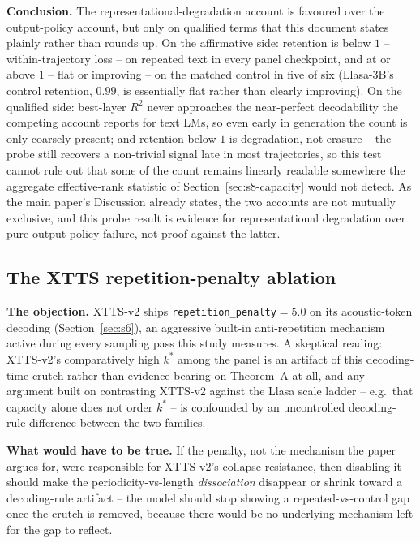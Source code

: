 \documentclass[11pt]{article}
\begin{document}
\textbf{Conclusion.} The representational-degradation account is favoured over
the output-policy account, but only on qualified terms that this document
states plainly rather than rounds up. On the affirmative side: retention is
below $1$ -- within-trajectory loss -- on repeated text in every panel
checkpoint, and at or above $1$ -- flat or improving -- on the matched control
in five of six (Llasa-3B's control retention, $0.99$, is essentially flat
rather than clearly improving). On the qualified side: best-layer $R^2$ never
approaches the near-perfect decodability the competing account reports for
text LMs, so even early in generation the count is only coarsely present; and
retention below $1$ is degradation, not erasure -- the probe still recovers a
non-trivial signal late in most trajectories, so this test cannot rule out
that some of the count remains linearly readable somewhere the aggregate
effective-rank statistic of Section~\ref{sec:s8-capacity} would not detect.
As the main paper's Discussion already states, the two accounts are not
mutually exclusive, and this probe result is evidence for representational
degradation over pure output-policy failure, not proof against the latter.

\subsection{The XTTS repetition-penalty ablation}
\label{sec:s8-ablation}

\textbf{The objection.} XTTS-v2 ships \texttt{repetition\_penalty}$=5.0$ on
its acoustic-token decoding (Section~\ref{sec:s6}), an aggressive built-in
anti-repetition mechanism active during every sampling pass this study
measures. A skeptical reading: XTTS-v2's comparatively high $k^\ast$ among the
panel is an artifact of this decoding-time crutch rather than evidence
bearing on Theorem~A at all, and any argument built on contrasting XTTS-v2
against the Llasa scale ladder -- e.g.\ that capacity alone does not order
$k^\ast$ -- is confounded by an uncontrolled decoding-rule difference between
the two families.

\textbf{What would have to be true.} If the penalty, not the mechanism the
paper argues for, were responsible for XTTS-v2's collapse-resistance, then
disabling it should make the periodicity-vs-length \emph{dissociation}
disappear or shrink toward a decoding-rule artifact -- the model should stop
showing a repeated-vs-control gap once the crutch is removed, because there
would be no underlying mechanism left for the gap to reflect.
\end{document}
